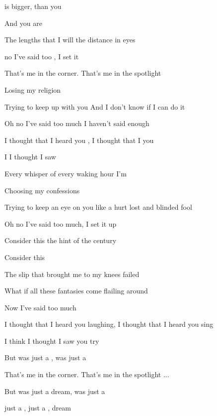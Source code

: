 

\zs
{} is bigger,
 than you

And you are 

The lengths that I will 
the distance in  eyes

 no I've said too ,
I set it 
\ks

\zs
That's me in the corner.
That's me in the spotlight

Losing my religion

Trying to keep up with you
And I don't know if I can do it

Oh no I've said too much
I haven't said enough
\ks

\zr
I thought that I heard you ,
I thought that I  you 

I  I thought I saw   
\kr

\zs
Every whisper
of every waking hour I'm

Choosing my confessions

Trying to keep an eye on you
like a hurt lost and blinded fool

Oh no I've said too much,
I set it up
\ks

\zs
Consider this
the hint of the century

Consider this

The slip that brought me
to my knees failed

What if all these fantasies
come flailing around

Now I've said too much
\ks

\zr
I thought that I heard you laughing,
I thought that I heard you sing

I think I thought I saw you try
\kr

\zr
But  was just a ,
 was just a 
\kr

\zs
That's me in the corner.
That's me in the spotlight ...
\ks

\zr
But  was just a dream,
 was just a 

just a , just a , dream 
\kr

\kp






















